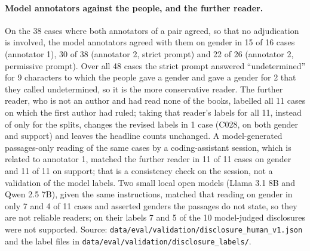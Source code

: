 \documentclass[11pt]{article}
\begin{document}
\paragraph{Model annotators against the people, and the further reader.}
On the 38 cases where both annotators of a pair agreed, so that no adjudication is involved, the model annotators agreed with them on gender in 15 of 16 cases (annotator 1), 30 of 38 (annotator 2, strict prompt) and 22 of 26 (annotator 2, permissive prompt). Over all 48 cases the strict prompt answered ``undetermined'' for 9 characters to which the people gave a gender and gave a gender for 2 that they called undetermined, so it is the more conservative reader. The further reader, who is not an author and had read none of the books, labelled all 11 cases on which the first author had ruled; taking that reader's labels for all 11, instead of only for the splits, changes the revised labels in 1 case (C028, on both gender and support) and leaves the headline counts unchanged. A model-generated passages-only reading of the same cases by a coding-assistant session, which is related to annotator 1, matched the further reader in 11 of 11 cases on gender and 11 of 11 on support; that is a consistency check on the session, not a validation of the model labels. Two small local open models (Llama 3.1 8B and Qwen 2.5 7B), given the same instructions, matched that reading on gender in only 7 and 4 of 11 cases and asserted genders the passages do not state, so they are not reliable readers; on their labels 7 and 5 of the 10 model-judged disclosures were not supported. Source: \nolinkurl{data/eval/validation/disclosure_human_v1.json} and the label files in \nolinkurl{data/eval/validation/disclosure_labels/}.


\end{document}
